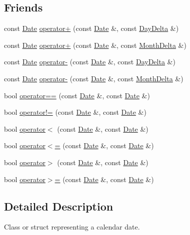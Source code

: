 \subsection*{\-Friends}
\begin{DoxyCompactItemize}
\item 
const \hyperlink{structDate}{\-Date} \hyperlink{structDate_afc6646e7b6659756a35c69d580b6f4de}{operator+} (const \hyperlink{structDate}{\-Date} \&, const \hyperlink{structDayDelta}{\-Day\-Delta} \&)
\item 
const \hyperlink{structDate}{\-Date} \hyperlink{structDate_a157166d061bacfeb288cd353596085ee}{operator+} (const \hyperlink{structDate}{\-Date} \&, const \hyperlink{structMonthDelta}{\-Month\-Delta} \&)
\item 
const \hyperlink{structDate}{\-Date} \hyperlink{structDate_a15dda58b1fd26ac63d64049c8f984881}{operator-\/} (const \hyperlink{structDate}{\-Date} \&, const \hyperlink{structDayDelta}{\-Day\-Delta} \&)
\item 
const \hyperlink{structDate}{\-Date} \hyperlink{structDate_ac17b7b59d24c18ff7bdf4bc60434174d}{operator-\/} (const \hyperlink{structDate}{\-Date} \&, const \hyperlink{structMonthDelta}{\-Month\-Delta} \&)
\item 
bool \hyperlink{structDate_ad51822da99f2cc001b6326ac28bd49d6}{operator==} (const \hyperlink{structDate}{\-Date} \&, const \hyperlink{structDate}{\-Date} \&)
\item 
bool \hyperlink{structDate_a5ac1b43688828377f31de974e061006f}{operator!=} (const \hyperlink{structDate}{\-Date} \&, const \hyperlink{structDate}{\-Date} \&)
\item 
bool \hyperlink{structDate_acbc7a012dc46ebcd65dfd2887e3a3ad4}{operator$<$} (const \hyperlink{structDate}{\-Date} \&, const \hyperlink{structDate}{\-Date} \&)
\item 
bool \hyperlink{structDate_aec251fea3c00fa40e6e9e07a90620f78}{operator$<$=} (const \hyperlink{structDate}{\-Date} \&, const \hyperlink{structDate}{\-Date} \&)
\item 
bool \hyperlink{structDate_a042bfc86a816127e316415634bb99107}{operator$>$} (const \hyperlink{structDate}{\-Date} \&, const \hyperlink{structDate}{\-Date} \&)
\item 
bool \hyperlink{structDate_a04118d56c46df4ac9054f0e34d2a6ce2}{operator$>$=} (const \hyperlink{structDate}{\-Date} \&, const \hyperlink{structDate}{\-Date} \&)
\end{DoxyCompactItemize}


\subsection{\-Detailed \-Description}
\-Class or struct representing a calendar date. 

